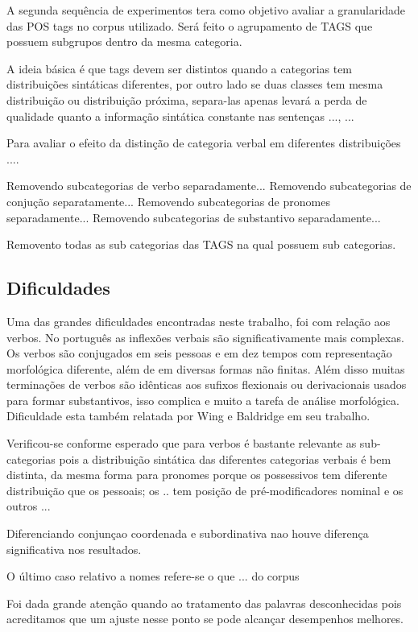 A segunda sequência de experimentos tera como objetivo avaliar a granularidade das POS tags no corpus utilizado. Será feito o agrupamento de TAGS que possuem subgrupos dentro da mesma categoria.

A ideia básica é que tags devem ser distintos quando a categorias tem distribuições sintáticas diferentes, por outro lado se duas classes tem mesma distribuição ou distribuição próxima, separa-las apenas levará a perda de qualidade quanto a informação sintática constante nas sentenças ...,  ...


Para avaliar o efeito da distinção de categoria verbal em diferentes distribuições ....


Removendo subcategorias de verbo separadamente...
Removendo subcategorias de conjução separatamente...
Removendo subcategorias de pronomes separadamente...
Removendo subcategorias de substantivo separadamente...

Removento todas as sub categorias das TAGS na qual possuem sub categorias. 

\subsection{Dificuldades}
\label{sec:dificuldades}

Uma das grandes dificuldades encontradas neste trabalho, foi com relação aos verbos. No português as inflexões verbais são significativamente mais complexas. Os verbos são conjugados em seis pessoas e em dez tempos com representação morfológica diferente, além de em diversas formas não finitas. Além disso muitas terminações de verbos são idênticas aos sufixos flexionais ou derivacionais usados para formar substantivos, isso complica e muito a tarefa de análise morfológica. Dificuldade esta também relatada por Wing e Baldridge em seu trabalho.

Verificou-se conforme esperado que para verbos é bastante relevante as sub-categorias pois a distribuição sintática das diferentes categorias verbais é bem distinta, da mesma forma para pronomes porque os possessivos tem diferente distribuição que os pessoais; os .. tem posição de pré-modificadores nominal e os outros ...

Diferenciando conjunçao coordenada e subordinativa nao houve diferença significativa nos resultados.

O último caso relativo a nomes refere-se  o que ... do corpus 

Foi dada grande atenção quando ao tratamento das palavras desconhecidas pois acreditamos que um ajuste nesse ponto se pode alcançar desempenhos melhores.

